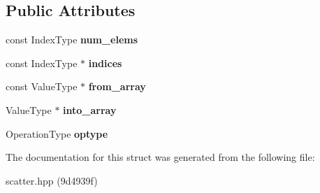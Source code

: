 \subsection*{Public Attributes}
\begin{DoxyCompactItemize}
\item 
\mbox{\label{structschwz_1_1Scatter_a43252cdb86c252b755384ce913530016}} 
const Index\+Type {\bfseries num\+\_\+elems}
\item 
\mbox{\label{structschwz_1_1Scatter_ace6df48951fb83fde6e7a69779253d8b}} 
const Index\+Type $\ast$ {\bfseries indices}
\item 
\mbox{\label{structschwz_1_1Scatter_ad956399c31d1c016f97802de1b844440}} 
const Value\+Type $\ast$ {\bfseries from\+\_\+array}
\item 
\mbox{\label{structschwz_1_1Scatter_af0f17b144ec184891ad4f3411f6d83cc}} 
Value\+Type $\ast$ {\bfseries into\+\_\+array}
\item 
\mbox{\label{structschwz_1_1Scatter_a86486db4091ef57dc8e4526f1b9e8d94}} 
Operation\+Type {\bfseries optype}
\end{DoxyCompactItemize}


The documentation for this struct was generated from the following file\+:\begin{DoxyCompactItemize}
\item 
scatter.\+hpp (9d4939f)\end{DoxyCompactItemize}
